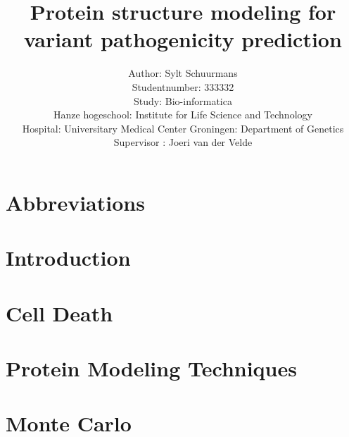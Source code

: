 \documentclass[10pt]{article}
\begin{document}
	\title{Protein structure modeling for variant pathogenicity prediction}
	\author{Author: Sylt Schuurmans\\
		Studentnumber: 333332\\
		Study: Bio-informatica\\
		Hanze hogeschool: Institute for Life Science and Technology\\
		Hospital: Universitary Medical Center Groningen: Department of Genetics\\
		Supervisor : Joeri van der Velde}
	\maketitle
	\newpage
	
	\restoregeometry
	
	
	\tableofcontents
	\newpage
	
	\listoffigures
	\newpage
	
	\section*{Abbreviations}
	
	\label{section:Chap_Abbreviations}
	\newpage
	
	\section*{Introduction}
	
	\label{section:Chap_Introduction}
	\newpage
	

	\section{Cell Death}
	
	\label{section:Chap_Cell Death}
	\newpage

	\section{Protein Modeling Techniques}
	
	\label{section:Chap_Protein_Modeling_Techniques}
	\newpage
	
	\section{Monte Carlo}
	
	\label{section:Chap_Monte_Carlo}
	\newpage
	
\end{document}
